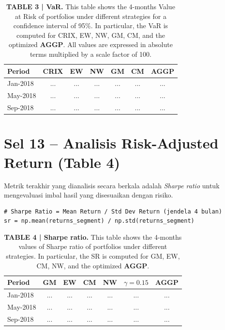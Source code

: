 \documentclass[12pt,a4paper]{article}
\begin{document}
\begin{table}[h]
    \centering
    \footnotesize
    \caption{\textbf{TABLE 3 | VaR.} This table shows the 4-months Value at Risk of portfolios under different strategies for a confidence interval of 95\%. In particular, the VaR is computed for CRIX, EW, NW, GM, CM, and the optimized \textbf{AGGP}. All values are expressed in absolute terms multiplied by a scale factor of 100.}
    \begin{tabular}{lcccccc}
        \toprule
        Period & CRIX & EW & NW & GM & CM & AGGP \\
        \midrule
        Jan-2018 & ... & ... & ... & ... & ... & ... \\
        May-2018 & ... & ... & ... & ... & ... & ... \\
        Sep-2018 & ... & ... & ... & ... & ... & ... \\
        \bottomrule
    \end{tabular}
\end{table}

\section{Sel 13 -- Analisis Risk-Adjusted Return (Table 4)}
Metrik terakhir yang dianalisis secara berkala adalah \textit{Sharpe ratio} untuk mengevaluasi imbal hasil yang disesuaikan dengan risiko.

\begin{lstlisting}[caption={Kalkulasi Sharpe Ratio Periodik}]
# Sharpe Ratio = Mean Return / Std Dev Return (jendela 4 bulan)
sr = np.mean(returns_segment) / np.std(returns_segment)
\end{lstlisting}

\begin{table}[h]
    \centering
    \footnotesize
    \caption{\textbf{TABLE 4 | Sharpe ratio.} This table shows the 4-months values of Sharpe ratio of portfolios under different strategies. In particular, the SR is computed for GM, EW, CM, NW, and the optimized \textbf{AGGP}.}
    \begin{tabular}{lcccccc}
        \toprule
        Period & GM & EW & CM & NW & $\gamma=0.15$ & AGGP \\
        \midrule
        Jan-2018 & ... & ... & ... & ... & ... & ... \\
        May-2018 & ... & ... & ... & ... & ... & ... \\
        Sep-2018 & ... & ... & ... & ... & ... & ... \\
        \bottomrule
    \end{tabular}
\end{table}
\end{document}
